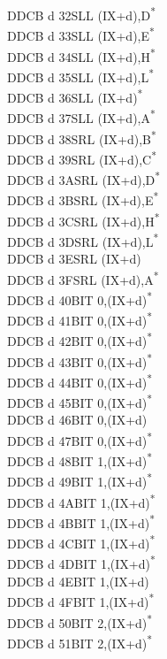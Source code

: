 \documentclass[oneside,a4paper]{book}
\begin{document}
\begin{multicols}{3}
{\begin{tabbing}
DDCB d 32\>SLL (IX+d),D\textsuperscript{*}\\
DDCB d 33\>SLL (IX+d),E\textsuperscript{*}\\
DDCB d 34\>SLL (IX+d),H\textsuperscript{*}\\
DDCB d 35\>SLL (IX+d),L\textsuperscript{*}\\
DDCB d 36\>SLL (IX+d)\textsuperscript{*}\\
DDCB d 37\>SLL (IX+d),A\textsuperscript{*}\\
DDCB d 38\>SRL (IX+d),B\textsuperscript{*}\\
DDCB d 39\>SRL (IX+d),C\textsuperscript{*}\\
DDCB d 3A\>SRL (IX+d),D\textsuperscript{*}\\
DDCB d 3B\>SRL (IX+d),E\textsuperscript{*}\\
DDCB d 3C\>SRL (IX+d),H\textsuperscript{*}\\
DDCB d 3D\>SRL (IX+d),L\textsuperscript{*}\\
DDCB d 3E\>SRL (IX+d)\\
DDCB d 3F\>SRL (IX+d),A\textsuperscript{*}\\
DDCB d 40\>BIT 0,(IX+d)\textsuperscript{*}\\
DDCB d 41\>BIT 0,(IX+d)\textsuperscript{*}\\
DDCB d 42\>BIT 0,(IX+d)\textsuperscript{*}\\
DDCB d 43\>BIT 0,(IX+d)\textsuperscript{*}\\
DDCB d 44\>BIT 0,(IX+d)\textsuperscript{*}\\
DDCB d 45\>BIT 0,(IX+d)\textsuperscript{*}\\
DDCB d 46\>BIT 0,(IX+d)\\
DDCB d 47\>BIT 0,(IX+d)\textsuperscript{*}\\
DDCB d 48\>BIT 1,(IX+d)\textsuperscript{*}\\
DDCB d 49\>BIT 1,(IX+d)\textsuperscript{*}\\
DDCB d 4A\>BIT 1,(IX+d)\textsuperscript{*}\\
DDCB d 4B\>BIT 1,(IX+d)\textsuperscript{*}\\
DDCB d 4C\>BIT 1,(IX+d)\textsuperscript{*}\\
DDCB d 4D\>BIT 1,(IX+d)\textsuperscript{*}\\
DDCB d 4E\>BIT 1,(IX+d)\\
DDCB d 4F\>BIT 1,(IX+d)\textsuperscript{*}\\
DDCB d 50\>BIT 2,(IX+d)\textsuperscript{*}\\
DDCB d 51\>BIT 2,(IX+d)\textsuperscript{*}\\

\end{tabbing}}
\end{multicols}
\end{document}
